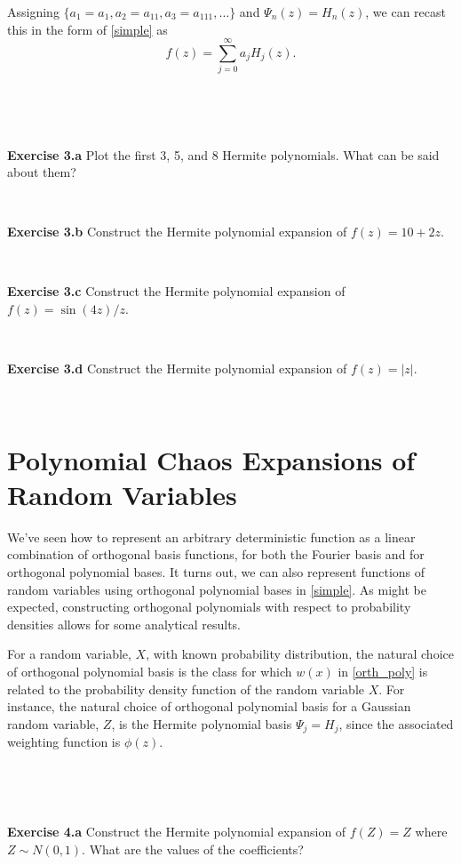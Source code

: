 \documentclass[11pt]{article}
\numberwithin{equation}{section}
\begin{document}
Assigning $\{a_1 = a_1, a_2 = a_{11}, a_3 = a_{111}, ...\}$ and $\Psi_n(z) = H_n(z)$, we can recast this in the form of \eqref{simple} as
\begin{equation}
f(z) = \sum_{j=0}^{\infty} a_j H_j(z).
\end{equation}


\

\

\textbf{Exercise 3.a} Plot the first 3, 5, and 8 Hermite polynomials. What can be said about them?

\

\textbf{Exercise 3.b} Construct the Hermite polynomial expansion of $f(z) = 10 + 2z$.

\

\textbf{Exercise 3.c} Construct the Hermite polynomial expansion of $f(z) = \sin(4z)/z$.

\

\textbf{Exercise 3.d} Construct the Hermite polynomial expansion of $f(z) = |z|$.

\






\section{Polynomial Chaos Expansions of Random Variables}

We've seen how to represent an arbitrary deterministic function as a linear combination of orthogonal basis functions, for both the Fourier basis and for orthogonal polynomial bases. It turns out, we can also represent functions of random variables using orthogonal polynomial bases in \eqref{simple}. As might be expected, constructing orthogonal polynomials with respect to probability densities allows for some analytical results.

\qquad For a random variable, $X$, with known probability distribution, the natural choice of orthogonal polynomial basis is the class for which $w(x)$ in \eqref{orth_poly} is related to the probability density function of the random variable $X$. For instance, the natural choice of orthogonal polynomial basis for a Gaussian random variable, $Z$,  is the Hermite polynomial basis $\Psi_j = H_j$, since the associated weighting function is $\phi(z)$.




\

\

\textbf{Exercise 4.a} Construct the Hermite polynomial expansion of $f(Z) = Z$ where $Z \sim N(0,1)$. What are the values of the coefficients?
\end{document}
